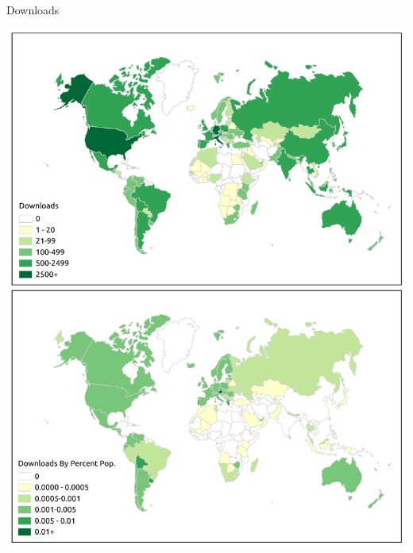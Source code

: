 \documentclass{beamer}
\begin{document}
\begin{frame}{Downloads}
\vspace{-.25in}
	\begin{minipage}{\textwidth}
		\begin{center}
			\includegraphics[width=.6\textwidth]{DownloadMapQGIS.pdf}
		\end{center}
	\end{minipage}
\end{frame}

\end{document}
